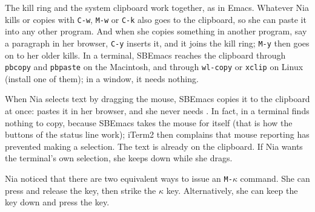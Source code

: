 \documentclass[a4paper,12pt,openany]{book}
\begin{document}
The kill ring and the system clipboard work together, as in
Emacs. Whatever Nia kills or copies with \verb|C-w|, \verb|M-w| or
\verb|C-k| also goes to the clipboard, so she can paste it into any
other program. And when she copies something in another program,
say a paragraph in her browser, \verb|C-y| inserts it, and it joins
the kill ring; \verb|M-y| then goes on to her older kills. In a
terminal, SBEmacs reaches the clipboard through \verb|pbcopy| and
\verb|pbpaste| on the Macintosh, and through \verb|wl-copy| or
\verb|xclip| on Linux (install one of them); in a window, it needs
nothing.

When Nia selects text by dragging the mouse, SBEmacs copies it to the
clipboard at once:  pastes it in her browser, and she
never needs . In fact, in a terminal  finds
nothing to copy, because SBEmacs takes the mouse for itself (that is
how the buttons of the status line work); iTerm2 then complains that
mouse reporting has prevented making a selection. The text is
already on the clipboard. If Nia wants the terminal's own selection,
she keeps  down while she drags.

Nia noticed that there are two equivalent ways to
issue an \verb|M-|$\kappa$ command. She can
press and release the  key, then
strike the  $\kappa$ key. Alternatively, she
can keep the  key down and press
the \keys{$\kappa$} key.
\end{document}
